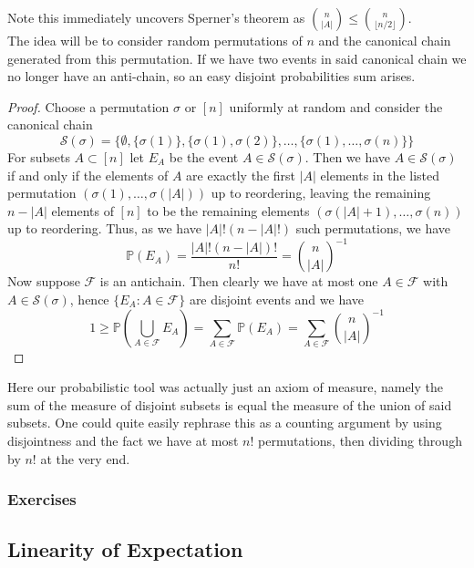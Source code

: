 \documentclass{article}
\begin{document}
Note this immediately uncovers Sperner's theorem as $\binom{n}{|A|} \leq \binom{n}{\lfloor n/2\rfloor}$. \\

The idea will be to consider random permutations of $n$ and the canonical chain generated from this permutation. 
If we have two events in said canonical chain we no longer have an anti-chain, so an easy disjoint probabilities 
sum arises. 

\begin{proof}
    Choose a permutation $\sigma$ or $[n]$ uniformly at random and consider the canonical chain 
    \[\mathcal{S}(\sigma) = \{\emptyset, \{\sigma(1)\}, \{\sigma(1), \sigma(2)\}, \dots, \{\sigma(1), \dots, \sigma(n)\}\}\]
    For subsets $A \subset [n]$ let $E_A$ be the event $A \in \mathcal{S}(\sigma)$. Then we have $A \in \mathcal{S}(\sigma)$ 
    if and only if the elements of $A$ are exactly the first $|A|$ elements in the listed permutation 
    $(\sigma(1), \dots, \sigma(|A|))$ up to reordering, leaving the remaining $n - |A|$ elements of $[n]$ to be the 
    remaining elements $(\sigma(|A| + 1), \dots, \sigma(n))$ up to reordering. Thus, as we have $|A|!(n-|A|!)$ 
    such permutations, we have \[\mathbb{P}(E_A) = \frac{|A|!(n-|A|)!}{n!} = \binom{n}{|A|}^{-1}\]
    Now suppose $\mathcal{F}$ is an antichain. Then clearly we have at most one $A \in \mathcal{F}$ with 
    $A \in \mathcal{S}(\sigma)$, hence $\{E_A : A \in \mathcal{F}\}$ are disjoint events and we have 
    \[1 \geq \mathbb{P}\left(\bigcup_{A \in \mathcal{F}}E_A\right) = \sum_{A \in \mathcal{F}}\mathbb{P}(E_A)
    = \sum_{A \in \mathcal{F}}\binom{n}{|A|}^{-1}\]
\end{proof}

Here our probabilistic tool was actually just an axiom of measure, namely the sum of the measure of disjoint 
subsets is equal the measure of the union of said subsets. One could quite easily rephrase this as a counting argument 
by using disjointness and the fact we have at most $n!$ permutations, then dividing through by $n!$ at the very end. 

\subsubsection*{Exercises}

\newpage

\subsection{Linearity of Expectation}
\end{document}
